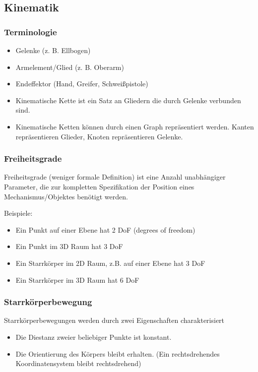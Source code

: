 \documentclass[paper=a4, fontsize=11pt]{scrartcl} %
\numberwithin{equation}{section} %
\numberwithin{figure}{section} %
\numberwithin{table}{section} %
\begin{document}
\subsection{Kinematik}

\subsubsection{Terminologie}

\begin{itemize}
\item Gelenke (z. B. Ellbogen)
\item Armelement/Glied (z. B. Oberarm)
\item Endeffektor (Hand, Greifer, Schweißpistole)
\item Kinematische Kette ist ein Satz an Gliedern die durch Gelenke verbunden sind.
\item Kinematische Ketten können durch einen Graph repräsentiert werden. Kanten repräsentieren Glieder, Knoten repräsentieren Gelenke.
\end{itemize}

\subsubsection{Freiheitsgrade}

Freiheitsgrade (weniger formale Definition) ist eine Anzahl unabhängiger Parameter, die zur kompletten Spezifikation der Position eines Mechanismus/Objektes benötigt werden.

Beispiele:
\begin{itemize}
\item Ein Punkt auf einer Ebene hat 2 DoF (degrees of freedom)
\item Ein Punkt im 3D Raum hat 3 DoF
\item Ein Starrkörper im 2D Raum, z.B. auf einer Ebene hat 3 DoF
\item Ein Starrkörper im 3D Raum hat 6 DoF
\end{itemize}

\subsubsection{Starrkörperbewegung}

Starrkörperbewegungen werden durch zwei Eigenschaften charakterisiert
\begin{itemize}
\item Die Diestanz zweier beliebiger Punkte ist konstant.
\item Die Orientierung des Körpers bleibt erhalten. (Ein rechtsdrehendes Koordinatensystem bleibt rechtsdrehend)
\end{itemize}
\end{document}
